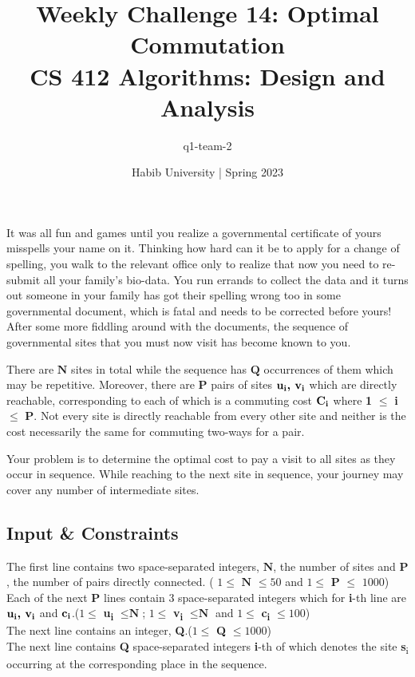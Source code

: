 \documentclass[a4paper]{exam}
\title{Weekly Challenge 14: Optimal Commutation\\CS 412 Algorithms: Design and Analysis}
\author{q1-team-2}  %
\date{Habib University | Spring 2023}
\begin{document}
\maketitle

\begin{questions}



  It was all fun and games until you realize a governmental certificate of yours misspells your name on it. Thinking how hard can it be to apply for a change of spelling, you walk to the relevant office only to realize that now you need to re-submit all your family's bio-data. You run errands to collect the data and it turns out someone in your family has got their spelling wrong too in some governmental document, which is fatal and needs to be corrected before yours! After some more fiddling around with the documents, the sequence of governmental sites that you must now visit has become known to you.

  There are $\textbf{N}$ sites in total while the sequence has $\textbf{Q}$ occurrences of them which may be repetitive. Moreover, there are $\textbf{P}$ pairs of sites $\textbf{u\textsubscript{i}, v\textsubscript{i}}$ which are directly reachable, corresponding to each of which is a commuting cost $\textbf{C\textsubscript{i}}$ where \textbf{1} $\leq$ \textbf{i} $\leq$ \textbf{P}. Not every site is directly reachable from every other site and neither is the cost necessarily the same for commuting two-ways for a pair.

  Your problem is to determine the optimal cost to pay a visit to all sites as they occur in sequence. While reaching to the next site in sequence, your journey may cover any number of intermediate sites.

  \subsection*{Input \& Constraints}
  The first line contains two space-separated integers, $\textbf{N}$,  the number of sites and $\textbf{P}$, the number of pairs directly connected. ( $1\leq $ $\textbf{N}$ $\leq 50$ and  $1\leq $ $\textbf{P}$ $\leq $ $1000$)\\
  Each of the next $\textbf{P}$ lines contain 3 space-separated integers which for \textbf{i}-th line are $\textbf{u\textsubscript{i}, v\textsubscript{i}}$  and $\textbf{c\textsubscript{i}}$.($1\leq $ \textbf{u\textsubscript{i}} $\leq \textbf{N}$; $1\leq $ \textbf{v\textsubscript{i}} $\leq \textbf{N}$ and $1\leq $ \textbf{c\textsubscript{i}} $\leq 100$) \\
  The next line contains an integer, \textbf{Q}.($1\leq$ \textbf{Q} $\leq 1000$) \\
  The next line contains \textbf{Q} space-separated integers \textbf{i}-th of which denotes the site \textbf{s}\textsubscript{i} occurring at the corresponding place in the sequence.\\


\end{questions}
\end{document}
